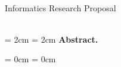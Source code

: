 \thispagestyle{plain}

\begin{center}
  \Huge
  \textbf{\@title}\\
  \vspace{.5em}
  \normalsize
  Informatics Research Proposal\\
  \@author\\
  \@date
\end{center}

\newcommand{\abstractmargin}{2cm}

\leftskip  = \abstractmargin
\rightskip = \abstractmargin
\noindent
\textbf{Abstract.}

\leftskip  = 0cm
\rightskip = 0cm
